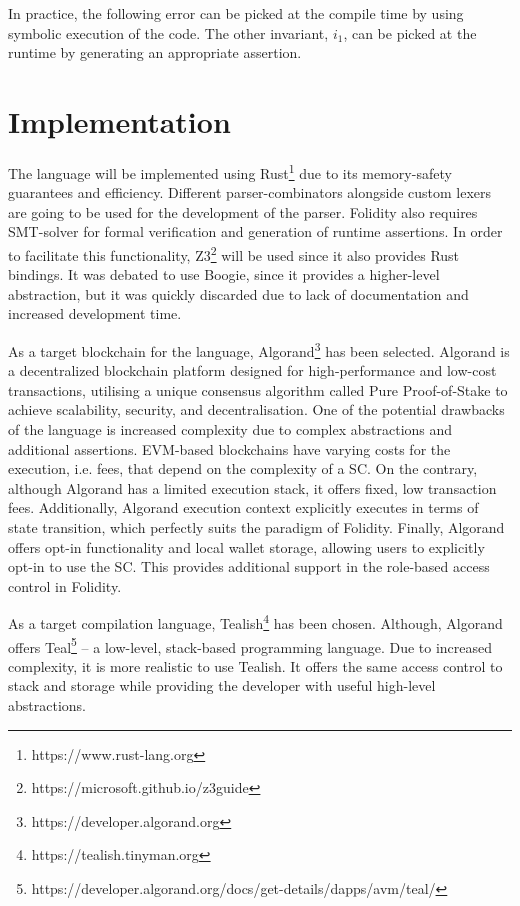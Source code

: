 \documentclass[oneside]{ecsproject}     %
\begin{document}
In practice, the following error can be picked at the compile time by using symbolic execution of the code.
The other invariant, $i_1$, can be picked at the runtime by generating an appropriate assertion.

\section{Implementation}

The language will be implemented using Rust\footnote{https://www.rust-lang.org} due to its memory-safety guarantees and efficiency. 
Different parser-combinators alongside custom lexers are going to be used for the development of the parser. 
Folidity also requires SMT-solver for formal verification and generation of runtime assertions. In order to facilitate this functionality,
Z3\footnote{https://microsoft.github.io/z3guide} will be used since it also provides Rust bindings. It was debated to use Boogie, since it provides
a higher-level abstraction, but it was quickly discarded due to lack of documentation and increased development time.

As a target blockchain for the language, Algorand\footnote{https://developer.algorand.org} has been selected. 
Algorand is a decentralized blockchain platform designed for high-performance and low-cost transactions, 
utilising a unique consensus algorithm called Pure Proof-of-Stake to achieve scalability, security, and decentralisation\cite{algorand}.
One of the potential drawbacks of the language is increased complexity due to complex abstractions and additional assertions. 
EVM-based blockchains have varying costs for the execution, i.e. fees, that depend on the complexity of a SC. 
On the contrary, although Algorand has a limited execution stack, it offers fixed, low transaction fees.
Additionally, Algorand execution context explicitly executes in terms of state transition, which perfectly suits the paradigm of Folidity.
Finally, Algorand offers opt-in functionality and local wallet storage, allowing users to explicitly opt-in to use the SC.
This provides additional support in the role-based access control in Folidity.

As a target compilation language, Tealish\footnote{https://tealish.tinyman.org} has been chosen.
Although, Algorand offers Teal\footnote{https://developer.algorand.org/docs/get-details/dapps/avm/teal/} –
a low-level, stack-based programming language. Due to increased complexity, it is more realistic to use Tealish.
It offers the same access control to stack and storage while providing the developer with useful high-level abstractions.
\end{document}
